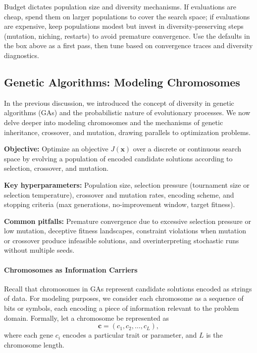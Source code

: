\begin{tcolorbox}[summarybox, title={Author's note: population and mutation heuristics}]
Budget dictates population size and diversity mechanisms. If evaluations are cheap, spend them on larger populations to cover the search space; if evaluations are expensive, keep populations modest but invest in diversity-preserving steps (mutation, niching, restarts) to avoid premature convergence. Use the defaults in the box above as a first pass, then tune based on convergence traces and diversity diagnostics.
\end{tcolorbox}

\subsection{Genetic Algorithms: Modeling Chromosomes}
\label{sec:evo_genetic_algorithms_modeling_chromosomes}

In the previous discussion, we introduced the concept of diversity in genetic algorithms (GAs) and the probabilistic nature of evolutionary processes. We now delve deeper into modeling chromosomes and the mechanisms of genetic inheritance, crossover, and mutation, drawing parallels to optimization problems.

\begin{tcolorbox}[summarybox, title={Genetic algorithm at a glance}]
\textbf{Objective:} Optimize an objective \(J(\mathbf{x})\) over a discrete or continuous search space by evolving a population of encoded candidate solutions according to selection, crossover, and mutation.\par
\textbf{Key hyperparameters:} Population size, selection pressure (tournament size or selection temperature), crossover and mutation rates, encoding scheme, and stopping criteria (max generations, no-improvement window, target fitness).\par
\textbf{Common pitfalls:} Premature convergence due to excessive selection pressure or low mutation, deceptive fitness landscapes, constraint violations when mutation or crossover produce infeasible solutions, and overinterpreting stochastic runs without multiple seeds.
\end{tcolorbox}

\paragraph{Chromosomes as Information Carriers}

Recall that chromosomes in GAs represent candidate solutions encoded as strings of data. For modeling purposes, we consider each chromosome as a sequence of bits or symbols, each encoding a piece of information relevant to the problem domain. Formally, let a chromosome be represented as
\begin{equation}
\mathbf{c} = (c_1, c_2, \ldots, c_L),
\label{eq:ga_chromosome_representation}
\end{equation}
where each gene \( c_i \) encodes a particular trait or parameter, and \( L \) is the chromosome length.

